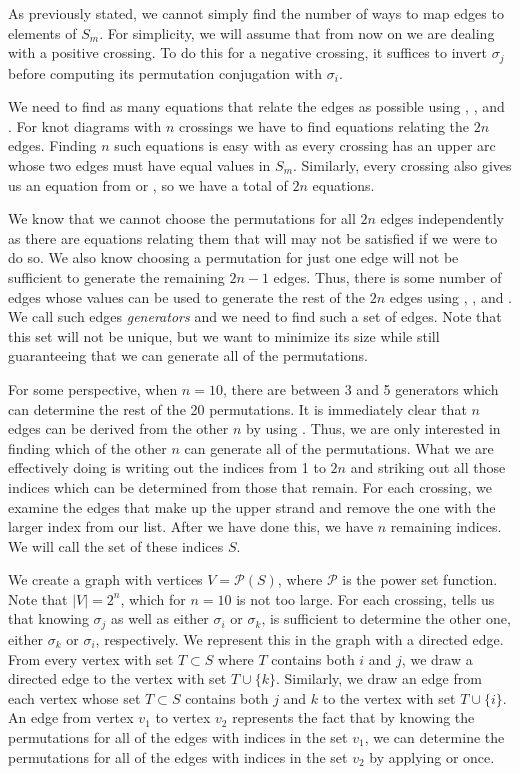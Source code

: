 \begin{paper}
As previously stated, we cannot simply find the number of ways to map edges to
elements of $S_m$.
For simplicity, we will assume that from now on we are dealing with a positive
crossing.
To do this for a negative crossing, it suffices to invert $\sigma_j$ before
computing its permutation conjugation with $\sigma_i$.

We need to find as many equations that relate the edges as possible using
\eqUpper, \eqPositive, and \eqNegative.
For knot diagrams with $n$ crossings we have to find equations relating the $2n$
edges.
Finding $n$ such equations is easy with \eqUpper as every crossing has an upper
arc whose two edges must have equal values in $S_m$.
Similarly, every crossing also gives us an equation from \eqRight or \eqLeft, so
we have a total of $2n$ equations.

We know that we cannot choose the permutations for all $2n$ edges independently
as there are equations relating them that will may not be satisfied if we were
to do so.
We also know choosing a permutation for just one edge will not be sufficient to
generate the remaining $2n-1$ edges.
Thus, there is some number of edges whose values can be used to generate the
rest of the $2n$ edges using \eqUpper, \eqRight, and \eqLeft.
We call such edges \textit{generators} and we need to find such a set of
edges.
Note that this set will not be unique, but we want to minimize its size while
still guaranteeing that we can generate all of the permutations.

For some perspective, when $n=10$, there are between 3 and 5 generators which
can determine the rest of the 20 permutations.
It is immediately clear that $n$ edges can be derived from the other $n$ by
using \eqUpper.
Thus, we are only interested in finding which of the other $n$ can generate all
of the permutations.
What we are effectively doing is writing out the indices from 1 to $2n$ and
striking out all those indices which can be determined from those that remain.
For each crossing, we examine the edges that make up the upper strand and remove
the one with the larger index from our list.
After we have done this, we have $n$ remaining indices.
We will call the set of these indices $S$.

We create a graph with vertices $V=\mathcal{P}(S)$, where $\mathcal{P}$ is the
power set function.
Note that $|V|=2^n$, which for $n=10$ is not too large.
For each crossing, \eqRight tells us that knowing $\sigma_j$ as well as either
$\sigma_i$ or $\sigma_k$, is sufficient to determine the other one, either
$\sigma_k$ or $\sigma_i$, respectively.
We represent this in the graph with a directed edge.
From every vertex with set $T\subset S$ where $T$ contains both $i$ and $j$, we
draw a directed edge to the vertex with set $T\cup\{k\}$.
Similarly, we draw an edge from each vertex whose set $T\subset S$ contains both
$j$ and $k$ to the vertex with set $T\cup\{i\}$.
An edge from vertex $v_1$ to vertex $v_2$ represents the fact that by knowing
the permutations for all of the edges with indices in the set $v_1$, we can
determine the permutations for all of the edges with indices in the set $v_2$ by
applying \eqRight or \eqLeft once.


\end{paper}
